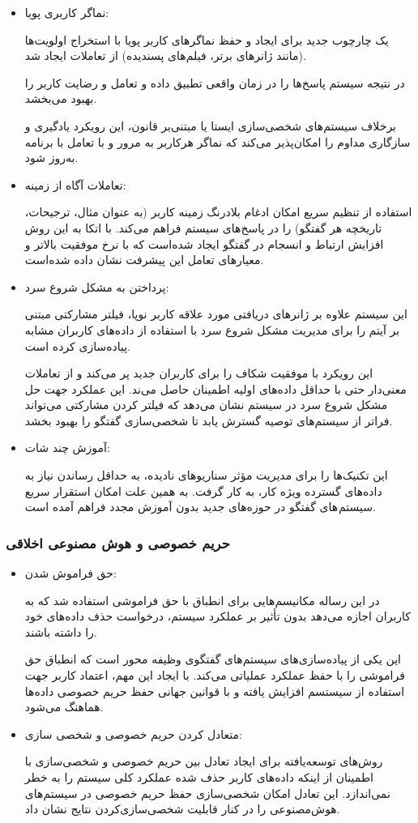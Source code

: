 \begin{itemize}
\item
 نماگر کاربری پویا:

 یک چارچوب جدید برای ایجاد و حفظ نماگر‌های کاربر پویا با استخراج اولویت‌ها (مانند ژانرهای برتر، فیلم‌های پسندیده) از تعاملات ایجاد شد.

در نتیجه سیستم پاسخ‌ها را در زمان واقعی تطبیق داده و تعامل و رضایت کاربر را بهبود می‌بخشد.

برخلاف سیستم‌های شخصی‌سازی ایستا یا مبتنی‌بر قانون، این رویکرد یادگیری و سازگاری مداوم را امکان‌پذیر می‌کند که نماگر هرکاربر به مرور و با تعامل با برنامه به‌روز شود.
\item
 تعاملات آگاه از زمینه:

استفاده از تنظیم سریع امکان ادغام بلادرنگ زمینه کاربر (به عنوان مثال، ترجیحات، تاریخچه هر گفتگو) را در پاسخ‌های سیستم فراهم می‌کند. با اتکا به این روش افزایش ارتباط و انسجام در گفتگو ایجاد شده‌است که با نرخ موفقیت بالاتر و معیارهای تعامل این پیشرفت نشان داده شده‌است.
\item
پرداختن به مشکل شروع سرد:

این سیستم علاوه بر ژانرهای دریافتی مورد علاقه کاربر نوپا، فیلتر مشارکتی مبتنی بر آیتم را برای مدیریت مشکل شروع سرد با استفاده از داده‌های کاربران مشابه پیاده‌سازی کرده است.

این رویکرد با موفقیت شکاف را برای کاربران جدید پر می‌کند و از تعاملات معنی‌دار حتی با حداقل داده‌های اولیه اطمینان حاصل می‌ند. این عملکرد جهت حل مشکل شروع سرد در سیستم نشان می‌دهد که فیلتر کردن مشارکتی می‌تواند فراتر از سیستم‌های توصیه گسترش یابد تا شخصی‌سازی گفتگو را بهبود بخشد.
\item
 آموزش چند شات:

 این تکنیک‌ها را برای مدیریت مؤثر سناریوهای نادیده، به حداقل رساندن نیاز به داده‌های گسترده ویژه کار، به کار گرفت.
به همین علت امکان استقرار سریع سیستم های گفتگو در حوزه‌های جدید بدون آموزش مجدد فراهم آمده است.
\end{itemize}


\subsubsection{حریم خصوصی و هوش مصنوعی اخلاقی}

\begin{itemize}
\item
 حق فراموش شدن:

در این رساله مکانیسم‌هایی برای انطباق با حق فراموشی استفاده شد که به کاربران اجازه می‌دهد بدون تأثیر بر عملکرد سیستم، درخواست حذف داده‌های خود را داشته باشند.

این یکی از پیاده‌سازی‌های سیستم‌های گفتگوی وظیفه محور است که انطباق حق فراموشی را با حفظ عملکرد عملیاتی می‌کند. با ایجاد این مهم، اعتماد کاربر جهت استفاده از سیستسم افزایش یافته و با قوانین جهانی حفظ حریم خصوصی داده‌ها هماهنگ می‌شود.
\item
 متعادل کردن حریم خصوصی و شخصی سازی:

روش‌های توسعه‌یافته برای ایجاد تعادل بین حریم خصوصی و شخصی‌سازی با اطمینان از اینکه داده‌های کاربر حذف شده عملکرد کلی سیستم را به خطر نمی‌اندازد. این تعادل امکان شخصی‌سازی حفظ حریم خصوصی در سیستم‌های هوش‌مصنوعی را در کنار قابلیت شخصی‌سازی‌کردن نتایج نشان داد.
\end{itemize}

